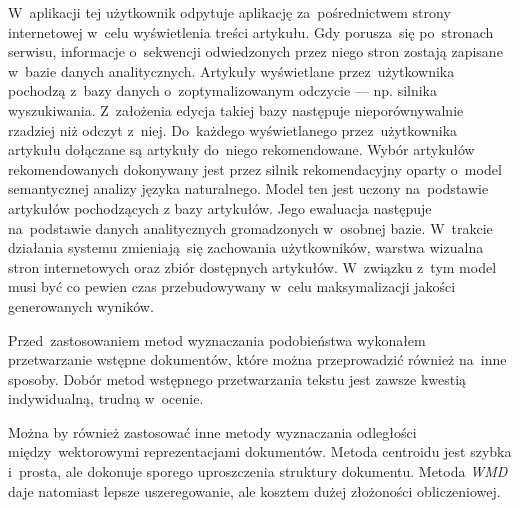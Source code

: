 \documentclass[pl]{minipw} %
\begin{document}
W~aplikacji tej użytkownik odpytuje aplikację za~pośrednictwem strony internetowej w~celu wyświetlenia treści artykułu. Gdy porusza~się po~stronach serwisu, informacje o~sekwencji odwiedzonych przez niego stron zostają zapisane w~bazie danych analitycznych. Artykuły wyświetlane przez~użytkownika pochodzą z~bazy danych o~zoptymalizowanym odczycie --- np. silnika wyszukiwania. Z~założenia edycja takiej bazy następuje nieporównywalnie rzadziej niż odczyt z~niej. Do~każdego wyświetlanego przez~użytkownika artykułu dołączane są artykuły do~niego rekomendowane. Wybór artykułów rekomendowanych dokonywany jest przez silnik rekomendacyjny oparty o~model semantycznej analizy języka naturalnego. Model ten jest uczony na~podstawie artykułów pochodzących z bazy artykułów. Jego ewaluacja następuje na~podstawie danych analitycznych gromadzonych w~osobnej bazie. W~trakcie działania systemu zmieniają~się zachowania użytkowników, warstwa wizualna stron internetowych oraz zbiór dostępnych artykułów. W~związku z~tym model musi być co pewien czas przebudowywany w~celu maksymalizacji jakości generowanych wyników.

Przed~zastosowaniem metod wyznaczania podobieństwa wykonałem przetwarzanie wstępne dokumentów, które można przeprowadzić również na~inne sposoby. Dobór metod wstępnego przetwarzania tekstu jest zawsze kwestią indywidualną, trudną w~ocenie.

Można by również zastosować inne metody wyznaczania odległości między~wektorowymi reprezentacjami dokumentów. Metoda centroidu jest szybka i~prosta, ale dokonuje sporego uproszczenia struktury dokumentu. Metoda \textit{WMD} daje natomiast lepsze uszeregowanie, ale kosztem dużej złożoności obliczeniowej.
\end{document}
